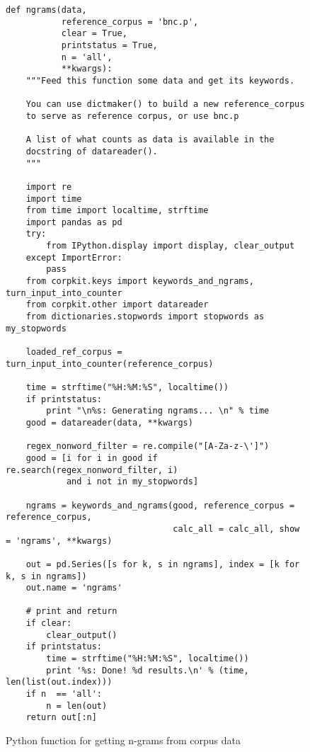 \begin{figure}
\centering
\begin{minipage}[c]{.75\textwidth}
\centering
\begin{verbatim}
def ngrams(data,
           reference_corpus = 'bnc.p',
           clear = True, 
           printstatus = True, 
           n = 'all',
           **kwargs):
    """Feed this function some data and get its keywords.

    You can use dictmaker() to build a new reference_corpus 
    to serve as reference corpus, or use bnc.p

    A list of what counts as data is available in the 
    docstring of datareader().
    """
    
    import re
    import time
    from time import localtime, strftime
    import pandas as pd
    try:
        from IPython.display import display, clear_output
    except ImportError:
        pass
    from corpkit.keys import keywords_and_ngrams, turn_input_into_counter
    from corpkit.other import datareader
    from dictionaries.stopwords import stopwords as my_stopwords

    loaded_ref_corpus = turn_input_into_counter(reference_corpus)
    
    time = strftime("%H:%M:%S", localtime())
    if printstatus:
        print "\n%s: Generating ngrams... \n" % time
    good = datareader(data, **kwargs)

    regex_nonword_filter = re.compile("[A-Za-z-\']")
    good = [i for i in good if re.search(regex_nonword_filter, i) 
            and i not in my_stopwords] 

    ngrams = keywords_and_ngrams(good, reference_corpus = reference_corpus, 
                                 calc_all = calc_all, show = 'ngrams', **kwargs)

    out = pd.Series([s for k, s in ngrams], index = [k for k, s in ngrams])
    out.name = 'ngrams'

    # print and return
    if clear:
        clear_output()
    if printstatus:
        time = strftime("%H:%M:%S", localtime())
        print '%s: Done! %d results.\n' % (time, len(list(out.index)))
    if n  == 'all':
        n = len(out)
    return out[:n]
\end{verbatim}
\caption{Python function for getting n-grams from corpus data}
\label{fig:code}
\end{minipage}
\end{figure}
%
